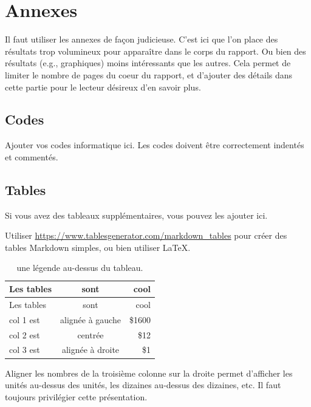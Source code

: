 \documentclass[mstat,12pt]{unswthesis}
\begin{document}
\label{refs}
\begin{CSLReferences}{0}{1}
\end{CSLReferences}




\chapter*{Annexes}\label{annexes}

Il faut utiliser les annexes de façon judicieuse. C'est ici que l'on
place des résultats trop volumineux pour apparaître dans le corps du
rapport. Ou bien des résultats (e.g., graphiques) moins intéressants que
les autres. Cela permet de limiter le nombre de pages du coeur du
rapport, et d'ajouter des détails dans cette partie pour le lecteur
désireux d'en savoir plus.

\section*{\texorpdfstring{\textbf{Codes}}{Codes}}\label{codes}

Ajouter vos codes informatique ici. Les codes doivent être correctement
indentés et commentés.

\section*{\texorpdfstring{\textbf{Tables}}{Tables}}\label{tables}

Si vous avez des tableaux supplémentaires, vous pouvez les ajouter ici.

Utiliser \url{https://www.tablesgenerator.com/markdown_tables} pour
créer des tables Markdown simples, ou bien utiliser \LaTeX.

\begin{longtable}[]{@{}lcr@{}}
\caption{une légende au-dessus du tableau.
\label{tab7.1}}\tabularnewline
\toprule\noalign{}
Les tables & sont & cool \\
\midrule\noalign{}
\endfirsthead
\toprule\noalign{}
Les tables & sont & cool \\
\midrule\noalign{}
\endhead
\bottomrule\noalign{}
\endlastfoot
col 1 est & alignée à gauche & \$1600 \\
col 2 est & centrée & \$12 \\
col 3 est & alignée à droite & \$1 \\
\end{longtable}

Aligner les nombres de la troisième colonne sur la droite permet
d'afficher les unités au-dessus des unités, les dizaines au-dessus des
dizaines, etc. Il faut toujours privilégier cette présentation.
\end{document}
